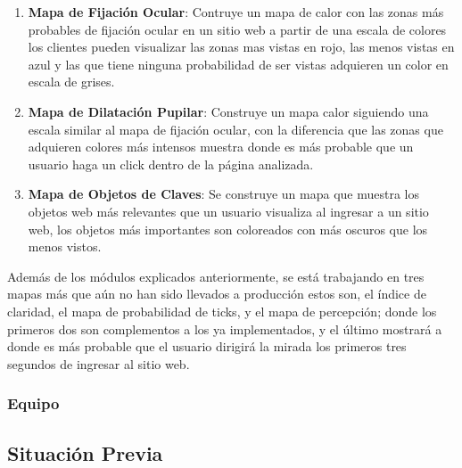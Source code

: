 {				\begin{enumerate}
					\item \textbf{Mapa de Fijación Ocular}: Contruye un mapa de calor con las zonas
					más probables de fijación ocular en un sitio web a partir de una escala de 
					colores los clientes pueden visualizar las zonas mas vistas en rojo, las menos 
					vistas en azul y las que tiene ninguna probabilidad de ser vistas adquieren un 
					color en escala de grises.
					\item \textbf{Mapa de Dilatación Pupilar}: Construye un mapa calor siguiendo una
					escala similar al mapa de fijación ocular, con la diferencia que las zonas que 
					adquieren colores más intensos muestra donde es más probable que un usuario haga
					un click dentro de la página analizada.
					\item \textbf{Mapa de Objetos de Claves}: Se construye un mapa que muestra los
					objetos web más relevantes que un usuario visualiza al ingresar a un sitio web, 
					los objetos más importantes son coloreados con más oscuros que los menos vistos. 
				\end{enumerate}
			Además de los módulos explicados anteriormente, se está trabajando en tres mapas más 
			que aún no han sido llevados a producción estos son, el índice de claridad, el mapa de 
			probabilidad de ticks, y el mapa de percepción; donde los primeros dos son complementos
			a los ya implementados, y el último mostrará a donde es más probable que el usuario 
			dirigirá la mirada los primeros tres segundos de ingresar al sitio web.				 
			}
		
	\subsubsection{Equipo}
	

	\subsection{Situación Previa}
	
